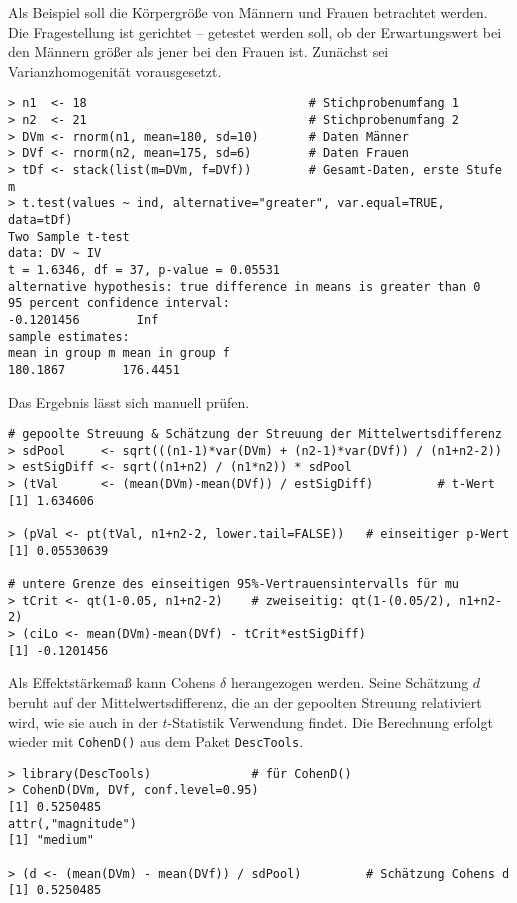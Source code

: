 Als Beispiel soll die Körpergröße von Männern und Frauen betrachtet werden. Die Fragestellung ist gerichtet -- getestet werden soll, ob der Erwartungswert bei den Männern größer als jener bei den Frauen ist. Zunächst sei Varianzhomogenität vorausgesetzt.
\begin{lstlisting}
> n1  <- 18                               # Stichprobenumfang 1
> n2  <- 21                               # Stichprobenumfang 2
> DVm <- rnorm(n1, mean=180, sd=10)       # Daten Männer
> DVf <- rnorm(n2, mean=175, sd=6)        # Daten Frauen
> tDf <- stack(list(m=DVm, f=DVf))        # Gesamt-Daten, erste Stufe m
> t.test(values ~ ind, alternative="greater", var.equal=TRUE, data=tDf)
Two Sample t-test
data: DV ~ IV
t = 1.6346, df = 37, p-value = 0.05531
alternative hypothesis: true difference in means is greater than 0
95 percent confidence interval:
-0.1201456        Inf
sample estimates:
mean in group m mean in group f
180.1867        176.4451
\end{lstlisting}

Das Ergebnis lässt sich manuell prüfen.
\begin{lstlisting}
# gepoolte Streuung & Schätzung der Streuung der Mittelwertsdifferenz
> sdPool     <- sqrt(((n1-1)*var(DVm) + (n2-1)*var(DVf)) / (n1+n2-2))
> estSigDiff <- sqrt((n1+n2) / (n1*n2)) * sdPool
> (tVal      <- (mean(DVm)-mean(DVf)) / estSigDiff)         # t-Wert
[1] 1.634606

> (pVal <- pt(tVal, n1+n2-2, lower.tail=FALSE))   # einseitiger p-Wert
[1] 0.05530639

# untere Grenze des einseitigen 95%-Vertrauensintervalls für mu
> tCrit <- qt(1-0.05, n1+n2-2)    # zweiseitig: qt(1-(0.05/2), n1+n2-2)
> (ciLo <- mean(DVm)-mean(DVf) - tCrit*estSigDiff)
[1] -0.1201456
\end{lstlisting}

Als Effektstärkemaß kann Cohens $\delta$ herangezogen werden. Seine Schätzung $d$ beruht auf der Mittelwertsdifferenz, die an der gepoolten Streuung relativiert wird, wie sie auch in der $t$-Statistik Verwendung findet. Die Berechnung erfolgt wieder mit \lstinline!CohenD()! aus dem Paket \lstinline!DescTools!.
\begin{lstlisting}
> library(DescTools)              # für CohenD()
> CohenD(DVm, DVf, conf.level=0.95)
[1] 0.5250485
attr(,"magnitude")
[1] "medium"

> (d <- (mean(DVm) - mean(DVf)) / sdPool)         # Schätzung Cohens d
[1] 0.5250485
\end{lstlisting}

